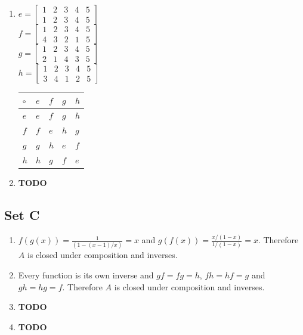 \documentclass{article}
\begin{document}
\begin{enumerate}
    \item \begin{minipage}{0.5\textwidth}
        \centering
        $e = \begin{bmatrix}
            1 & 2 & 3 & 4 & 5 \\
            1 & 2 & 3 & 4 & 5
        \end{bmatrix}$\\
        $f = \begin{bmatrix}
            1 & 2 & 3 & 4 & 5 \\
            4 & 3 & 2 & 1 & 5
        \end{bmatrix}$\\
        $g = \begin{bmatrix}
            1 & 2 & 3 & 4 & 5 \\
            2 & 1 & 4 & 3 & 5
        \end{bmatrix}$\\
        $h = \begin{bmatrix}
            1 & 2 & 3 & 4 & 5 \\
            3 & 4 & 1 & 2 & 5
        \end{bmatrix}$
    \end{minipage}
    \begin{minipage}{0.5\textwidth}
        \centering
        \begin{tabular}{l|llll}
            $\circ$ & $e$ & $f$ & $g$ & $h$ \\ \hline
            $e$       & $e$ & $f$ & $g$ & $h$ \\
            $f$       & $f$ & $e$ & $h$ & $g$ \\
            $g$       & $g$ & $h$ & $e$ & $f$ \\
            $h$       & $h$ & $g$ & $f$ & $e$
        \end{tabular}            
    \end{minipage}

    \item \textbf{TODO}
\end{enumerate}

\subsection{Set C}
\begin{enumerate}
    \item $f(g(x)) = \frac{1}{(1 - (x - 1) / x)} = x$ and $g(f(x)) = \frac{x/(1 - x)}{1/(1 - x)} = x$. Therefore $A$ is closed under composition and inverses.

    \item Every function is its own inverse and $gf = fg = h$, $fh = hf = g$ and $gh = hg = f$.  Therefore $A$ is closed under composition and inverses.

    \item \textbf{TODO}

    \item \textbf{TODO}
\end{enumerate}
\end{document}
